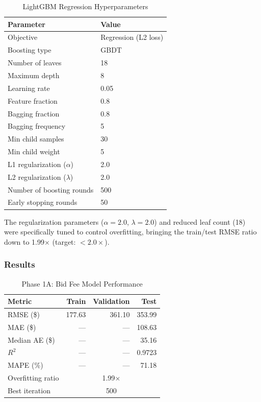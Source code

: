 \documentclass[12pt,a4paper]{article}
\begin{document}
\begin{table}[H]
\centering
\caption{LightGBM Regression Hyperparameters}
\label{tab:lgb-regression-params}
\begin{tabular}{ll}
\toprule
\textbf{Parameter} & \textbf{Value} \\
\midrule
Objective & Regression (L2 loss) \\
Boosting type & GBDT \\
Number of leaves & 18 \\
Maximum depth & 8 \\
Learning rate & 0.05 \\
Feature fraction & 0.8 \\
Bagging fraction & 0.8 \\
Bagging frequency & 5 \\
Min child samples & 30 \\
Min child weight & 5 \\
L1 regularization ($\alpha$) & 2.0 \\
L2 regularization ($\lambda$) & 2.0 \\
Number of boosting rounds & 500 \\
Early stopping rounds & 50 \\
\bottomrule
\end{tabular}
\end{table}

The regularization parameters ($\alpha = 2.0$, $\lambda = 2.0$) and reduced leaf count (18) were specifically tuned to control overfitting, bringing the train/test RMSE ratio down to 1.99$\times$ (target: $<2.0\times$).

\subsubsection{Results}

\begin{table}[H]
\centering
\caption{Phase 1A: Bid Fee Model Performance}
\label{tab:bidfee-results}
\begin{tabular}{lrrr}
\toprule
\textbf{Metric} & \textbf{Train} & \textbf{Validation} & \textbf{Test} \\
\midrule
RMSE (\$) & 177.63 & 361.10 & 353.99 \\
MAE (\$) & --- & --- & 108.63 \\
Median AE (\$) & --- & --- & 35.16 \\
$R^2$ & --- & --- & 0.9723 \\
MAPE (\%) & --- & --- & 71.18 \\
Overfitting ratio & \multicolumn{3}{c}{1.99$\times$} \\
Best iteration & \multicolumn{3}{c}{500} \\
\bottomrule
\end{tabular}
\end{table}
\end{document}
